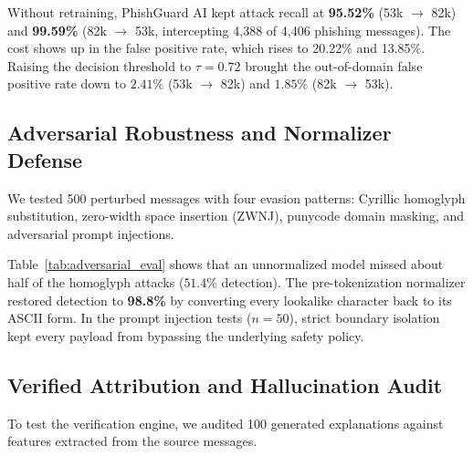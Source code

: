 \documentclass[conference]{IEEEtran}
\begin{document}
Without retraining, PhishGuard AI kept attack recall at \textbf{95.52\%} (53k $\rightarrow$ 82k) and \textbf{99.59\%} (82k $\rightarrow$ 53k, intercepting 4,388 of 4,406 phishing messages). The cost shows up in the false positive rate, which rises to 20.22\% and 13.85\%. Raising the decision threshold to $\tau = 0.72$ brought the out-of-domain false positive rate down to $2.41\%$ (53k $\rightarrow$ 82k) and $1.85\%$ (82k $\rightarrow$ 53k).

\subsection{Adversarial Robustness and Normalizer Defense}
We tested 500 perturbed messages with four evasion patterns: Cyrillic homoglyph substitution, zero-width space insertion (ZWNJ), punycode domain masking, and adversarial prompt injections.

\begin{table}[!t]
\caption{Adversarial Robustness and Normalizer Defense ($n=500$).}
\label{tab:adversarial_eval}
\centering\footnotesize
{}
\end{table}

Table~\ref{tab:adversarial_eval} shows that an unnormalized model missed about half of the homoglyph attacks ($51.4\%$ detection). The pre-tokenization normalizer restored detection to \textbf{98.8\%} by converting every lookalike character back to its ASCII form. In the prompt injection tests ($n=50$), strict boundary isolation kept every payload from bypassing the underlying safety policy.

\subsection{Verified Attribution and Hallucination Audit}
To test the verification engine, we audited 100 generated explanations against features extracted from the source messages.
\end{document}
